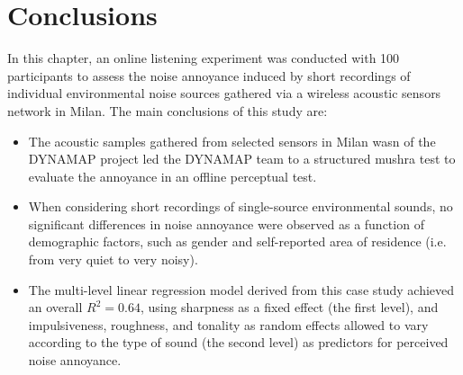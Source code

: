 

\section{Conclusions}

In this chapter, an online listening experiment was conducted with 100 participants to assess the noise annoyance induced by short recordings of individual environmental noise sources gathered via a wireless acoustic sensors network in Milan. The main conclusions of this study are:

\begin{itemize}
  \item The acoustic samples gathered from selected sensors in Milan \gls{wasn} of the DYNAMAP project led the DYNAMAP team to a structured \gls{mushra} test to evaluate the annoyance in an offline perceptual test.
  \item When considering short recordings of single-source environmental sounds, no significant differences in noise annoyance were observed as a function of demographic factors, such as gender and self-reported area of residence (i.e. from very quiet to very noisy).
  \item The multi-level linear regression model derived from this case study achieved an overall $R^2=0.64$, using sharpness as a fixed effect (the first level), and impulsiveness, roughness, and tonality as random effects allowed to vary according to the type of sound (the second level) as predictors for perceived noise annoyance.
\end{itemize}


